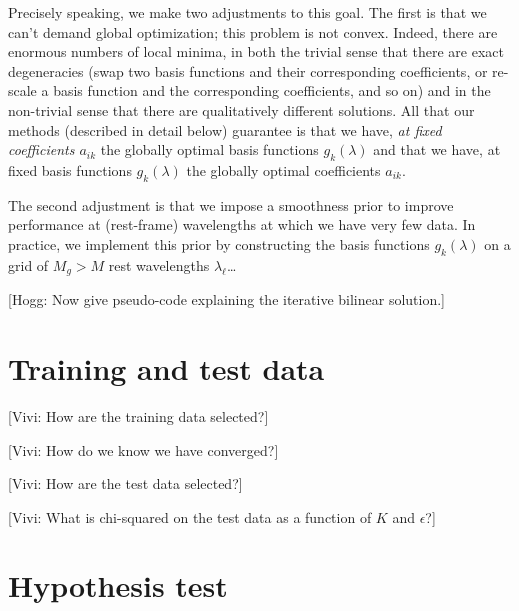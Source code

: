 \documentclass[12pt]{article}
\begin{document}
Precisely speaking, we make two adjustments to this goal.  The first
is that we can't demand global optimization; this problem is not
convex.  Indeed, there are enormous numbers of local minima, in both
the trivial sense that there are exact degeneracies (swap two basis
functions and their corresponding coefficients, or re-scale a basis
function and the corresponding coefficients, and so on) and in the
non-trivial sense that there are qualitatively different solutions.
All that our methods (described in detail below) guarantee is that we
have, \emph{at fixed coefficients $a_{ik}$} the globally optimal basis
functions $g_k(\lambda)$ and that we have, at fixed basis functions
$g_k(\lambda)$ the globally optimal coefficients $a_{ik}$.

The second adjustment is that we impose a smoothness prior to improve
performance at (rest-frame) wavelengths at which we have very few
data.  In practice, we implement this prior by constructing the basis
functions $g_k(\lambda)$ on a grid of $M_g>M$ rest wavelengths
$\lambda_{\ell}$\ldots

[Hogg: Now give pseudo-code explaining the iterative bilinear solution.]

\section{Training and test data}

[Vivi: How are the training data selected?]

[Vivi: How do we know we have converged?]

[Vivi: How are the test data selected?]

[Vivi: What is chi-squared on the test data as a function of $K$ and
  $\epsilon$?]

\section{Hypothesis test}
\end{document}
